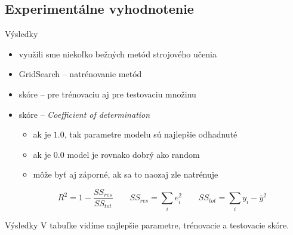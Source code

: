 \documentclass[xcolor={table}]{beamer}
\def\*{{\bf FIXME: }}
\begin{document}
		\subsection{Experimentálne vyhodnotenie}
			\begin{frame}{Výsledky}
				\begin{block}{}
					\begin{itemize}
						\item využili sme niekoľko bežných metód strojového učenia
						\item GridSearch -- natrénovanie metód
						\item skóre -- pre trénovaciu aj pre testovaciu množinu
						\item skóre -- \emph{Coefficient of determination}
						\begin{itemize}
							\item ak je $1.0$, tak parametre modelu sú najlepšie odhadnuté
							\item ak je $0.0$ model je rovnako dobrý ako random
							\item môže byť aj záporné, ak sa to naozaj zle natrénuje
						\end{itemize}
						$$R^2 = 1 - \frac{SS_{res}}{SS_{tot}} \qquad SS_{res} = \sum_i{e^2_i} \qquad SS_{tot}=\sum_i{y_i-\bar{y}}^2$$				
					\end{itemize}
				\end{block}
			\end{frame}	
			\begin{frame}{Výsledky}
					V tabuľke vidíme najlepšie parametre, trénovacie a testovacie skóre.
				\begin{table}[H]
					\centering
				\end{table}
			\end{frame}
\end{document}
